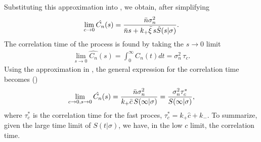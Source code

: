 Substituting this approximation into , we obtain, after simplifying
\begin{equation}
 \lim_{c \to 0} \hat{C_n}(s) = \frac{\bar{n} \sigma_n^2}{\bar{n} s + k_+ \bar{\xi} \, s \hat{S}(s|\sigma)}.
 \elabel{Corr_approx}
\end{equation}
The correlation time of the process is found by taking the $s \to 0$ limit
\begin{eqnarray}
 \lim_{s \to 0} \hat{C_n}(s) = \int_0^\infty C_n(t) dt = \sigma_n^2 \, \tau_c.
\end{eqnarray}
Using the approximation in , the general expression for the correlation time becomes ()
\begin{equation}
 \lim_{c \to 0, s \to 0} \hat{C_n}(s) = \frac{\bar{n} \sigma_n^2}{k_+ \bar{c} \, S(\infty|\sigma)} = \frac{\sigma_n^2 \tau_c^*}{S(\infty|\sigma)},
 \elabel{CT1}
\end{equation}
where $\tau_c^*$ is the correlation time for the fast proces, $\tau_c^* = k_+ \hat{c} + k_-$. To summarize, given the large time limit of $S(t|\sigma)$, we have, in the low $c$ limit, the correlation time.


